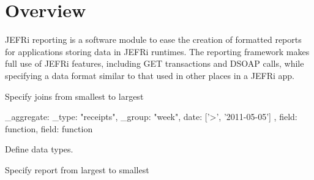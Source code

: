 \documentclass{article}
\begin{document}
\maketitle
\tableofcontents
\newpage
\linespread{1.6}

\section{Overview}
JEFRi reporting is a software module to ease the creation of formatted reports
for applications storing data in JEFRi runtimes. The reporting framework makes
full use of JEFRi features, including GET transactions and DSOAP calls, while
specifying a data format similar to that used in other places in a JEFRi app.

Specify joins from smallest to largest

{
	\_aggregate: {
		\_type: "receipts",
		\_group: "week",
		date: ['>', '2011-05-05']
	},
	field: function,
	field: function
}

Define data types.


Specify report from largest to smallest
\end{document}
